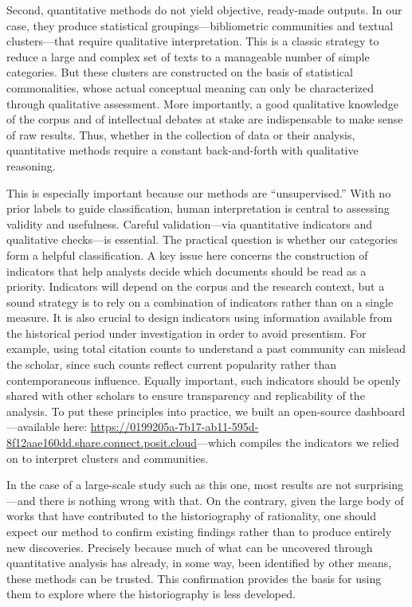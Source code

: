 \documentclass[
]{interact}
\begin{document}
Second, quantitative methods do not yield objective, ready-made outputs.
In our case, they produce statistical groupings---bibliometric
communities and textual clusters---that require qualitative
interpretation. This is a classic strategy to reduce a large and complex
set of texts to a manageable number of simple categories. But these
clusters are constructed on the basis of statistical commonalities,
whose actual conceptual meaning can only be characterized through
qualitative assessment. More importantly, a good qualitative knowledge
of the corpus and of intellectual debates at stake are indispensable to
make sense of raw results. Thus, whether in the collection of data or
their analysis, quantitative methods require a constant back-and-forth
with qualitative reasoning.

This is especially important because our methods are ``unsupervised.''
With no prior labels to guide classification, human interpretation is
central to assessing validity and usefulness. Careful validation---via
quantitative indicators and qualitative checks---is essential. The
practical question is whether our categories form a helpful
classification. A key issue here concerns the construction of indicators
that help analysts decide which documents should be read as a priority.
Indicators will depend on the corpus and the research context, but a
sound strategy is to rely on a combination of indicators rather than on
a single measure. It is also crucial to design indicators using
information available from the historical period under investigation in
order to avoid presentism. For example, using total citation counts to
understand a past community can mislead the scholar, since such counts
reflect current popularity rather than contemporaneous influence.
Equally important, such indicators should be openly shared with other
scholars to ensure transparency and replicability of the analysis. To
put these principles into practice, we built an open-source
dashboard---available here:
\url{https://0199205a-7b17-ab11-595d-8f12aae160dd.share.connect.posit.cloud}---which
compiles the indicators we relied on to interpret clusters and
communities.

In the case of a large-scale study such as this one, most results are
not surprising---and there is nothing wrong with that. On the contrary,
given the large body of works that have contributed to the
historiography of rationality, one should expect our method to confirm
existing findings rather than to produce entirely new discoveries.
Precisely because much of what can be uncovered through quantitative
analysis has already, in some way, been identified by other means, these
methods can be trusted. This confirmation provides the basis for using
them to explore where the historiography is less developed.
\end{document}
